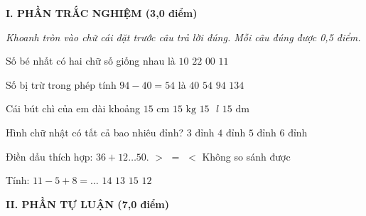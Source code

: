 
\setcounter{ex}{0}
\setcounter{bt}{0}

\textbf{\large I. PHẦN TRẮC NGHIỆM (3,0 điểm)}

{\itshape Khoanh tròn vào chữ cái đặt trước câu trả lời đúng. Mỗi câu đúng được 0,5 điểm.}

\begin{ex} %
Số bé nhất có hai chữ số giống nhau là
\choice
{$10$}
{$22$}
{$00$}
{\True $11$}
\end{ex}

\begin{ex} %
Số bị trừ trong phép tính $94 - 40 = 54$ là
\choice
{$40$}
{$54$}
{\True $94$}
{$134$}
\end{ex}

\begin{ex} %
Cái bút chì của em dài khoảng
\choice
{\True $15\text{ cm}$}
{$15\text{ kg}$}
{$15\text{ }l$}
{$15\text{ dm}$}
\end{ex}

\begin{ex} %
Hình chữ nhật có tất cả bao nhiêu đỉnh?
\choice
{$3$ đỉnh}
{\True $4$ đỉnh}
{$5$ đỉnh}
{$6$ đỉnh}
\end{ex}

\begin{ex} %
Điền dấu thích hợp: $36 + 12 \dots 50$.
\choice
{$>$}
{$=$}
{\True $<$}
{Không so sánh được}
\end{ex}

\begin{ex} %
Tính: $11 - 5 + 8 = \dots$
\choice
{\True $14$}
{$13$}
{$15$}
{$12$}
\end{ex}

\vspace{4mm}
\textbf{\large II. PHẦN TỰ LUẬN (7,0 điểm)}

